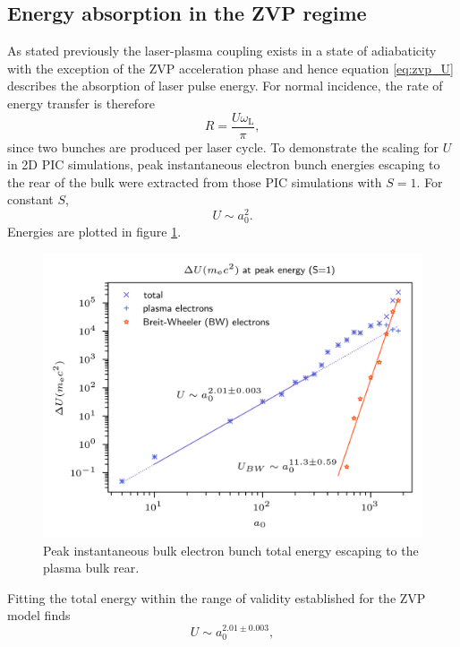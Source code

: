 \subsection{Energy absorption in the ZVP regime}\label{sec:zvp-energyabsorption}
As stated previously the laser-plasma coupling exists in a state of adiabaticity with the exception of the ZVP acceleration phase and hence equation \ref{eq:zvp_U} describes the absorption of laser pulse energy. For normal incidence, the rate of energy transfer is therefore
\begin{equation}\label{eq:zvp-rate}
	R = \frac{U\omega_\mathrm{L}}{\pi},
\end{equation}
since two bunches are produced per laser cycle. To demonstrate the scaling for $U$ in 2D PIC simulations, peak instantaneous electron bunch energies escaping to the rear of the bulk were extracted from those PIC simulations with $S=1$. For constant $S$, 
\begin{equation}
	U \sim a^2_0.
\end{equation}
Energies are plotted in figure \ref{fig:zvppeakgamma}.
\begin{figure}
	\centering
	\includegraphics[width=0.7\linewidth]{figures/zvp/zvp_peak_gamma}
	\caption[Peak instantaneous bulk electron bunch total energy escaping to the plasma bulk rear.]{Peak instantaneous bulk electron bunch total energy escaping to the plasma bulk rear.}
	\label{fig:zvppeakgamma}
\end{figure}
Fitting the total energy within the range of validity established for the ZVP model finds
\begin{equation}
	U \sim a^{2.01\pm0.003}_0,
\end{equation}
